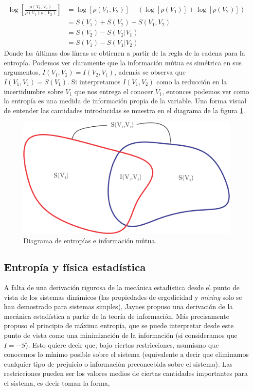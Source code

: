 \documentclass[executivepaper,12pt]{article}
\numberwithin{equation}{section}
\begin{document}
\begin{align*}
	\log\left[\frac{\rho(V_1,V_2)}{\rho(V_1)\rho(V_2)}\right]&=\log\left[\rho(V_1,V_2)\right]-(\log\left[\rho(V_1)\right] + \log\left[\rho(V_2)\right])\\
	&=S(V_1)+S(V_2)-S(V_1,V_2)\\
	&=S(V_2)-S(V_2\rvert V_1)\\
	&=S(V_1)-S(V_1\rvert V_2)
\end{align*}
Donde las  últimas dos líneas se obtienen a partir de la regla de la cadena para la entropía. Podemos ver claramente que la información mútua es simétrica en sus argumentos, $I(V_1,V_2)=I(V_2,V_1)$, además se observa que $I(V_1,V_1)=S(V_1)$. Si interpretamos $I(V_1,V_2)$ como la reducción en la incertidumbre sobre $V_1$ que nos entrega el conocer $V_1$, entonces podemos ver como la entropía es una medida de información propia de la variable. Una forma visual de entender las cantidades introducidas se muestra en el diagrama de la figura \ref{fig-infor4}.

 
\begin{figure}[H]
	\begin{center}
		\includegraphics[scale=1]{entropy1}
	\end{center}
	\caption{Diagrama de entropías e información mútua.}
	\label{fig-infor4}
\end{figure}


\subsection{Entropía y física estadística}

A falta de una derivación rigurosa de la mecánica estadística desde el punto de vista de los sistemas dinámicos \parencite{beck2009} (las propiedades de ergodicidad y \textit{mixing} solo se han demostrado para sistemas simples), Jaynes \parencite{jaynes1957} propuso una derivación de la mecánica estadística a partir de la teoría de información. Más precisamente propuso el principio de máxima entropía, que se puede interpretar desde este punto de vista como una minimización de la información (si consideramos que $I=-S$). Esto quiere decir que, bajo ciertas restricciones, asumismo que conocemos lo mínimo posible sobre el sistema (equivalente a decir que eliminamos cualquier tipo de prejuicio o información preconcebida sobre el sistema). Las restricciones pueden ser los valores medios de ciertas cantidades importantes para el sistema, es decir toman la forma,
\end{document}
